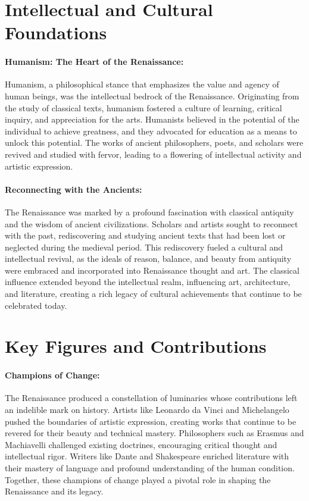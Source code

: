 \documentclass[a4paper,12pt]{book}
\begin{document}
\section*{Intellectual and Cultural Foundations}

\paragraph{Humanism: The Heart of the Renaissance:}
Humanism, a philosophical stance that emphasizes the value and agency of human beings, was the intellectual bedrock of the Renaissance. Originating from the study of classical texts, humanism fostered a culture of learning, critical inquiry, and appreciation for the arts. Humanists believed in the potential of the individual to achieve greatness, and they advocated for education as a means to unlock this potential. The works of ancient philosophers, poets, and scholars were revived and studied with fervor, leading to a flowering of intellectual activity and artistic expression.

\paragraph{Reconnecting with the Ancients:}
The Renaissance was marked by a profound fascination with classical antiquity and the wisdom of ancient civilizations. Scholars and artists sought to reconnect with the past, rediscovering and studying ancient texts that had been lost or neglected during the medieval period. This rediscovery fueled a cultural and intellectual revival, as the ideals of reason, balance, and beauty from antiquity were embraced and incorporated into Renaissance thought and art. The classical influence extended beyond the intellectual realm, influencing art, architecture, and literature, creating a rich legacy of cultural achievements that continue to be celebrated today.

\section*{Key Figures and Contributions}

\paragraph{Champions of Change:}
The Renaissance produced a constellation of luminaries whose contributions left an indelible mark on history. Artists like Leonardo da Vinci and Michelangelo pushed the boundaries of artistic expression, creating works that continue to be revered for their beauty and technical mastery. Philosophers such as Erasmus and Machiavelli challenged existing doctrines, encouraging critical thought and intellectual rigor. Writers like Dante and Shakespeare enriched literature with their mastery of language and profound understanding of the human condition. Together, these champions of change played a pivotal role in shaping the Renaissance and its legacy.
\end{document}
